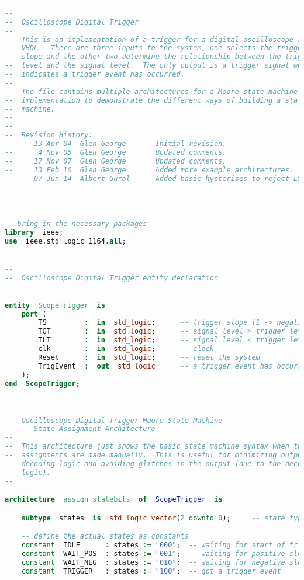 \begin{lstlisting}[language=vhdl]
----------------------------------------------------------------------------
--
--  Oscilloscope Digital Trigger
--
--  This is an implementation of a trigger for a digital oscilloscope in
--  VHDL.  There are three inputs to the system, one selects the trigger
--  slope and the other two determine the relationship between the trigger
--  level and the signal level.  The only output is a trigger signal which
--  indicates a trigger event has occurred.
--
--  The file contains multiple architectures for a Moore state machine
--  implementation to demonstrate the different ways of building a state
--  machine.
--
--
--  Revision History:
--     13 Apr 04  Glen George       Initial revision.
--      4 Nov 05  Glen George       Updated comments.
--     17 Nov 07  Glen George       Updated comments.
--     13 Feb 10  Glen George       Added more example architectures.
--     07 Jun 14  Albert Gural      Added basic hysterises to reject LSB noise issues.
--
----------------------------------------------------------------------------


-- bring in the necessary packages
library  ieee;
use  ieee.std_logic_1164.all;


--
--  Oscilloscope Digital Trigger entity declaration
--

entity  ScopeTrigger  is
    port (
        TS         :  in  std_logic;      -- trigger slope (1 -> negative, 0 -> positive)
        TGT        :  in  std_logic;      -- signal level > trigger level + epsilon
        TLT        :  in  std_logic;      -- signal level < trigger level - epsilon
        clk        :  in  std_logic;      -- clock
        Reset      :  in  std_logic;      -- reset the system
        TrigEvent  :  out  std_logic      -- a trigger event has occurred
    );
end  ScopeTrigger;


--
--  Oscilloscope Digital Trigger Moore State Machine
--     State Assignment Architecture
--
--  This architecture just shows the basic state machine syntax when the state
--  assignments are made manually.  This is useful for minimizing output
--  decoding logic and avoiding glitches in the output (due to the decoding
--  logic).
--

architecture  assign_statebits  of  ScopeTrigger  is

    subtype  states  is  std_logic_vector(2 downto 0);     -- state type

    -- define the actual states as constants
    constant  IDLE      : states := "000";  -- waiting for start of trigger event
    constant  WAIT_POS  : states := "001";  -- waiting for positive slope trigger
    constant  WAIT_NEG  : states := "010";  -- waiting for negative slope trigger
    constant  TRIGGER   : states := "100";  -- got a trigger event



\end{lstlisting}
